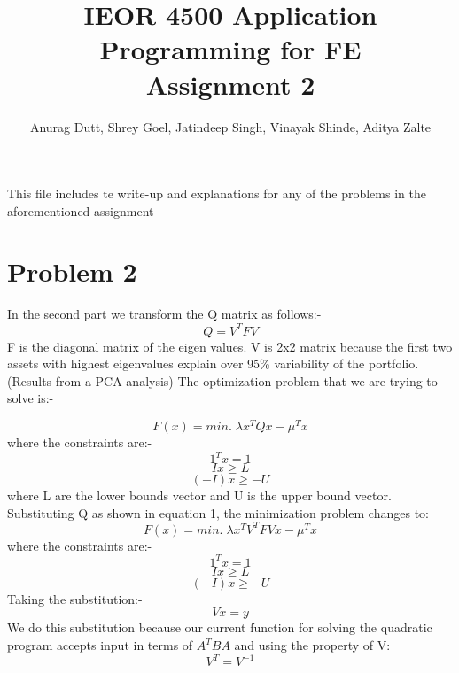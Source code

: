 \documentclass[twoside,11pt]{article}
\title{IEOR 4500 Application Programming for FE \\
  \large Assignment 2
} %
\author{Anurag Dutt, Shrey Goel, Jatindeep Singh, Vinayak Shinde, Aditya Zalte}    %
\begin{document}
\maketitle
This file includes te write-up and explanations for any of the problems in the aforementioned assignment

\section*{Problem 2}
In the second part we transform the Q matrix as follows:-
\begin{equation}
  Q = V^TFV
\end{equation}
F is the diagonal matrix of the eigen values.
V is 2x2 matrix because the first two assets with highest eigenvalues
explain over 95\% variability of the portfolio. (Results from a PCA analysis)
The optimization problem that we are trying to solve is:-

\begin{equation}
  F(x) = min.\; \lambda x^TQx - \mu^Tx
\end{equation}
where the constraints are:-
\begin{equation}
  1^Tx = 1
\end{equation}
\begin{equation}
  Ix \geqslant L
\end{equation}
\begin{equation}
  (-I)x \geqslant -U
\end{equation}
where L are the lower bounds vector and U is the upper bound vector.\\
Substituting Q as shown in equation 1, the minimization problem
changes to:
\begin{equation}
  F(x) = min.\; \lambda x^TV^TFVx - \mu^Tx
\end{equation}
where the constraints are:-
\begin{equation}
  1^Tx = 1
\end{equation}
\begin{equation}
  Ix \geqslant L
\end{equation}
\begin{equation}
  (-I)x \geqslant -U
\end{equation}
Taking the substitution:-
\begin{equation}
  Vx = y
\end{equation}
We do this substitution because our current function for solving the
quadratic program accepts input in terms of $A^TBA$ and using the
property of V:
\begin{equation}
  V^T = V^{-1}
\end{equation}
\end{document}
